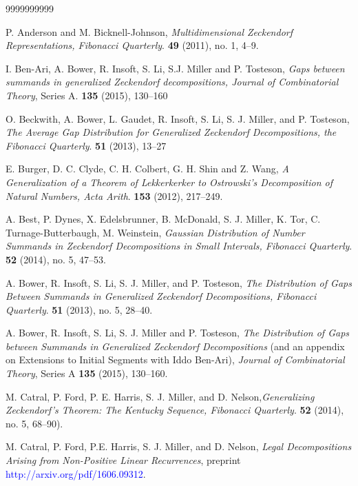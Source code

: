 \documentclass[]{interact}
\theoremstyle{plain}
\numberwithin{equation}{section} %
\numberwithin{table}{section} %
\numberwithin{figure}{section}
\begin{document}
\begin{thebibliography}{9999999999}

 P. Anderson and M. Bicknell-Johnson, \textit{Multidimensional Zeckendorf Representations, Fibonacci Quarterly}. \textbf{49} (2011), no. 1, 4--9.

 I. Ben-Ari, A. Bower, R. Insoft, S. Li, S.J. Miller and P. Tosteson, \textit{Gaps between summands in generalized Zeckendorf decompositions, Journal of Combinatorial Theory}, Series A. \textbf{135} (2015), 130--160

 O. Beckwith, A. Bower, L. Gaudet, R. Insoft, S. Li, S. J. Miller, and P. Tosteson, \textit{The Average Gap Distribution for Generalized Zeckendorf Decompositions, the Fibonacci Quarterly}. \textbf{51} (2013), 13--27 

 E. Burger, D. C. Clyde, C. H. Colbert, G. H. Shin and Z. Wang, \textit{A Generalization of a Theorem of Lekkerkerker to Ostrowski’s Decomposition of Natural Numbers, Acta Arith}. \textbf{153} (2012), 217–249.

 A. Best, P. Dynes, X. Edelsbrunner, B. McDonald, S. J. Miller, K. Tor, C. Turnage-Butterbaugh, M. Weinstein, \textit{Gaussian Distribution of Number Summands in Zeckendorf Decompositions in Small Intervals, Fibonacci Quarterly}. \textbf{52} (2014), no. 5, 47–53.

 A. Bower, R. Insoft, S. Li, S. J. Miller, and P. Tosteson, \textit{The Distribution of Gaps Between Summands in Generalized Zeckendorf Decompositions, Fibonacci Quarterly}. \textbf{51} (2013), no. 5, 28--40.

A. Bower, R. Insoft, S. Li, S. J. Miller and P. Tosteson, \textit{The Distribution of Gaps between Summands in Generalized Zeckendorf Decompositions} (and an appendix on Extensions to Initial Segments with Iddo Ben-Ari), \textit{Journal of Combinatorial Theory}, Series A \textbf{135} (2015), 130–160.

 M. Catral, P. Ford, P. E. Harris, S. J. Miller, and D. Nelson,\textit{Generalizing Zeckendorf’s Theorem: The Kentucky Sequence, Fibonacci Quarterly}. \textbf{52} (2014), no. 5, 68–90).

 M. Catral, P. Ford, P.E. Harris, S. J. Miller, and D. Nelson, \textit{Legal Decompositions Arising from Non-Positive Linear Recurrences}, preprint \textcolor{blue}{http://arxiv.org/pdf/1606.09312}.


\end{thebibliography}
\end{document}
